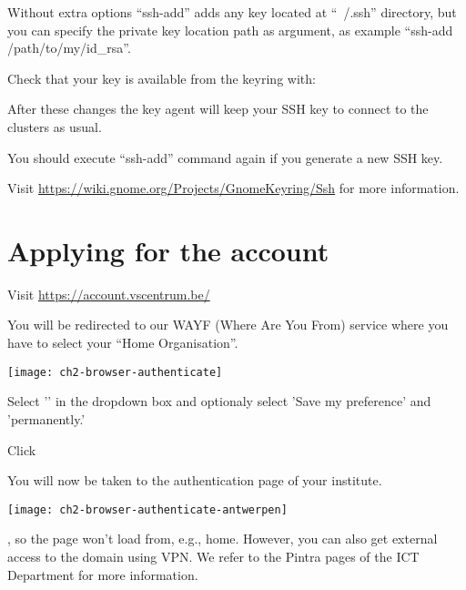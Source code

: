 \begin{tip}
  Without extra options ``ssh-add'' adds any key located at ``~/.ssh''
  directory, but you can specify the private key location path as argument,
  as example ``ssh-add /path/to/my/id\_rsa''.
\end{tip}

Check that your key is available from the keyring with:
\begin{prompt}
\end{prompt}

  After these changes the key agent will keep your SSH key to connect
  to the clusters as usual.
\begin{tip}
  You should execute ``ssh-add'' command again if you generate a new SSH key.
\end{tip}

  Visit \url{https://wiki.gnome.org/Projects/GnomeKeyring/Ssh} for
  more information.

\fi %

\section{Applying for the account}
\label{sec:applying-for-the-account}

Visit \url{https://account.vscentrum.be/}

You will be redirected to our WAYF (Where Are You From) service where you have to select your ``Home Organisation''.

\begin{center}
\texttt{[image: ch2-browser-authenticate]}
\end{center}

Select '\wayf' in the dropdown box and optionaly select 'Save my preference' and 'permanently.'

Click 

You will now be taken to the authentication page of your institute.

\ifantwerpen
\begin{center}
\texttt{[image: ch2-browser-authenticate-antwerpen]}
\end{center}

, so the page won't load from, e.g., home. However, you can also get
external access to the \university domain using VPN. We refer to the Pintra
pages of the ICT Department
for more information.

